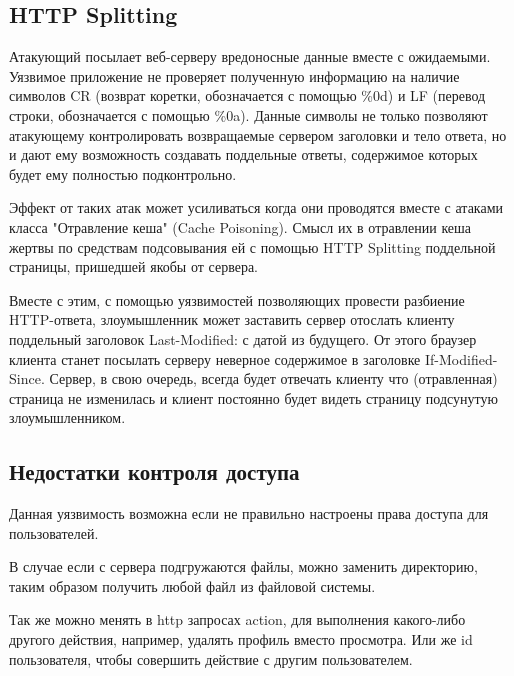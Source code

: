 \documentclass[11pt, a4paper]{article}		%
\begin{document}

\subsection{HTTP Splitting}

 Атакующий посылает веб-серверу вредоносные данные вместе с ожидаемыми. Уязвимое приложение не проверяет полученную
информацию на наличие символов CR (возврат коретки, обозначается с помощью \%0d) и LF (перевод строки, обозначается
с помощью \%0a). Данные символы не только позволяют атакующему контролировать возвращаемые сервером заголовки и тело ответа,
но и дают ему возможность создавать поддельные ответы, содержимое которых будет ему полностью подконтрольно.

Эффект от таких атак может усиливаться когда они проводятся вместе с атаками класса "Отравление кеша" (Cache Poisoning).
Смысл их в отравлении кеша жертвы по средствам подсовывания ей с помощью HTTP Splitting поддельной страницы,
пришедшей якобы от сервера.

Вместе с этим, с помощью уязвимостей позволяющих провести разбиение HTTP-ответа, злоумышленник может заставить сервер
отослать клиенту поддельный заголовок Last-Modified: с датой из будущего. От этого браузер клиента станет посылать серверу
неверное содержимое в заголовке If-Modified-Since. Сервер, в свою очередь, всегда будет отвечать клиенту что (отравленная)
страница не изменилась и клиент постоянно будет видеть страницу подсунутую злоумышленником.



\subsection{Недостатки контроля доступа}

Данная уязвимость возможна если не правильно настроены права доступа для пользователей.

В случае если с сервера подгружаются файлы, можно заменить директорию, таким образом получить любой файл из файловой системы.

Так же можно менять в http запросах action, для выполнения какого-либо другого действия, например, удалять профиль вместо просмотра.
Или же id пользователя, чтобы совершить действие с другим пользователем.



\end{document}
